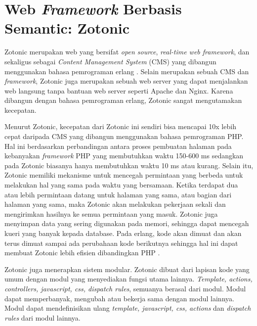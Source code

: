 \section{Web \textit{Framework} Berbasis Semantic: Zotonic}

Zotonic merupakan web yang bersifat \textit{open source}, \textit{real-time web framework}, dan sekaligus sebagai \textit{Content Management System} (CMS) yang dibangun menggunakan bahasa pemrograman erlang \citep{zotonic.overview}. Selain merupakan sebuah CMS dan \textit{framework}, Zotonic juga merupakan sebuah web server yang dapat menjalankan web langsung tanpa bantuan web server seperti Apache dan Nginx. Karena dibangun dengan bahasa pemrograman erlang, Zotonic sangat mengutamakan kecepatan.

Menurut Zotonic, kecepatan dari Zotonic ini sendiri bisa mencapai 10x lebih cepat daripada CMS yang dibangun menggunakan bahasa pemrograman PHP. Hal ini berdasarkan perbandingan antara proses pembuatan halaman pada kebanyakan \textit{framework} PHP yang membutuhkan waktu 150-600 ms sedangkan pada Zotonic biasanya hanya membutuhkan waktu 10 ms atau kurang. Selain itu, Zotonic memiliki mekanisme untuk mencegah permintaan yang berbeda untuk melakukan hal yang sama pada waktu yang bersamaan. Ketika terdapat dua atau lebih permintaan datang untuk halaman yang sama, atau bagian dari halaman yang sama, maka Zotonic akan melakukan pekerjaan sekali dan mengirimkan hasilnya ke semua permintaan yang masuk. Zotonic juga menyimpan data yang sering digunakan pada memori, sehingga dapat mencegah kueri yang banyak kepada database. Pada erlang, kode akan dimuat dan akan terus dimuat sampai ada perubahaan kode berikutnya sehingga hal ini dapat membuat Zotonic lebih efisien dibandingkan PHP \citep{zotonic.speed}.

Zotonic juga menerapkan sistem modular. Zotonic dibuat dari lapisan kode yang umum dengan modul yang menyediakan fungsi utama lainnya. \textit{Template, actions, controllers, javascript, css, dispatch rules}, semuanya berasal dari modul. Modul dapat memperbanyak, mengubah atau bekerja sama dengan modul lainnya. Modul dapat mendefinisikan ulang \textit{template, javascript, css, actions} dan \textit{dispatch rules} dari modul lainnya.

